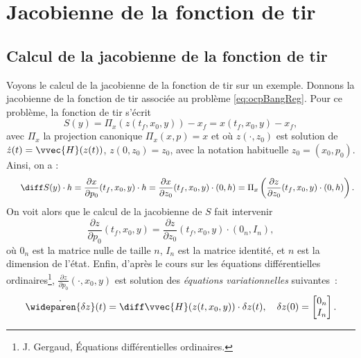 \section{Jacobienne de la fonction de tir}

\subsection{Calcul de la jacobienne de la fonction de tir}

Voyons le calcul de la jacobienne de la fonction de tir sur un exemple.
Donnons la jacobienne de la fonction de tir associ\'ee au probl\`eme \eqref{eq:ocpBangReg}. Pour ce probl\`eme, la fonction de tir
s'\'ecrit 
\[
    S(y) = \Pi_x(z(t_f,x_0,y)) - x_f = x(t_f,x_0,y) - x_f,
\]
avec $\Pi_x$ la projection canonique $\Pi_x(x,p) = x$ et
o\`u $z(\cdot,z_0)$ est solution de $\dot{z}(t) = \vvec{H}(z(t))$, $z(0,z_0) = z_0$, avec la notation habituelle $z_0 = (x_0,p_0)$. Ainsi, on a :
\begin{equation}
    \indent \diff S(y) \cdot h = \frac{\partial x}{\partial p_0}(t_f,x_0,y) \cdot h = \frac{\partial x}{\partial z_0}(t_f,x_0,y) \cdot (0,h)
    = \Pi_x\left(\frac{\partial z}{\partial z_0}(t_f,x_0,y) \cdot (0,h) \right).
    \label{eq:sjacSimple}
\end{equation}
On voit alors que le calcul de la jacobienne de $S$ fait intervenir
\[
    \frac{\partial z}{\partial p_0}(t_f,x_0,y) = \frac{\partial z}{\partial z_0}(t_f,x_0,y) \cdot(0_n, I_n),
\]
o\`u $0_n$ est la matrice nulle de taille $n$,
$I_n$ est la matrice identit\'e, et $n$ est la dimension de l'\'etat.
Enfin, d'apr\`es le cours sur les \'equations diff\'erentielles ordinaires\footnote{J. Gergaud, \'Equations diff\'erentielles ordinaires.},
$ \frac{\partial z}{\partial p_0}(\cdot,x_0,y)$ est solution des \emph{\'equations variationnelles} suivantes~:
\begin{equation}
    \dot{\wideparen{\delta z}}(t) =  \displaystyle \diff \vvec{H}(z(t,x_0,y))\cdot \delta z(t), \quad
    \delta z(0) = \begin{bmatrix}
                    0_n \\
                    I_n
                    \end{bmatrix}.
    \label{eq:eqvar}
\end{equation}

